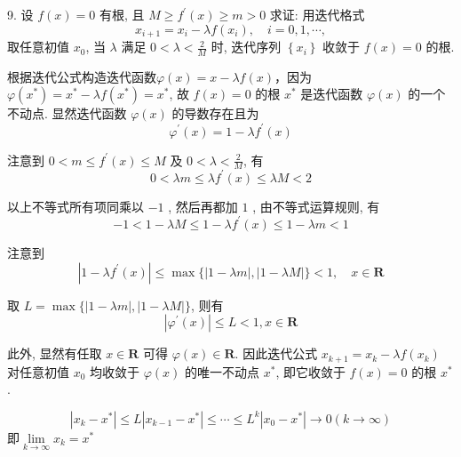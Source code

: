 \begin{tcolorbox}[breakable,enhanced,arc=0mm,outer arc=0mm,
		boxrule=0pt,toprule=1pt,leftrule=0pt,bottomrule=1pt, rightrule=0pt,left=0.2cm,right=0.2cm,
		titlerule=0.5em,toptitle=0.1cm,bottomtitle=-0.1cm,top=0.2cm,
		colframe=white!10!biru,colback=white!90!biru,coltitle=white,
            coltext=black,title =2024-04, title style={white!10!biru}, before skip=8pt, after skip=8pt,before upper=\hspace{2em},
		fonttitle=\bfseries,fontupper=\normalsize]
  
9. 设 $ f(x)=0 $ 有根, 且 $ M \geqslant f^{\prime}(x) \geqslant m>0 $ 求证: 用迭代格式
$$
x_{i+1}=x_{i}-\lambda f\left(x_{i}\right), \quad i=0,1, \cdots,
$$
取任意初值 $ x_{0} $, 当 $ \lambda $ 满足 $ 0<\lambda<\frac{2}{M} $ 时, 迭代序列 $ \left\{x_{i}\right\} $ 收敛于 $ f(x)=0 $ 的根.
\tcblower

根据迭代公式构造迭代函数$\varphi(x)=x-\lambda f(x)$，因为 $ \varphi\left(x^{*}\right)=x^{*}-\lambda f\left(x^{*}\right)=x^{*} $, 故 $ f(x)=0 $ 的根 $ x^{*} $ 是迭代函数 $ \varphi(x) $ 的一个不动点. 显然迭代函数 $ \varphi(x) $ 的导数存在且为
$$
\varphi^{\prime}(x)=1-\lambda f^{\prime}(x)
$$

注意到 $ 0<m \leqslant f^{\prime}(x) \leqslant M $ 及 $ 0<\lambda<\frac{2}{M} $, 有
$$
0<\lambda m \leqslant \lambda f^{\prime}(x) \leqslant \lambda M<2
$$

以上不等式所有项同乘以 $-1$ , 然后再都加 $1$ , 由不等式运算规则, 有
$$
-1<1-\lambda M \leqslant 1-\lambda f^{\prime}(x) \leqslant 1-\lambda m<1
$$

注意到
$$
\left|1-\lambda f^{\prime}(x)\right| \leqslant \max \{|1-\lambda m|,|1-\lambda M|\}<1, \quad x \in \mathbf{R}
$$

取 $ L=\max \{|1-\lambda m|,|1-\lambda M|\} $, 则有
$$
\left|\varphi^{\prime}(x)\right| \leqslant L<1, x \in \mathbf{R}
$$

此外, 显然有任取 $ x \in \mathbf{R} $ 可得 $ \varphi(x) \in \mathbf{R} $. 因此迭代公式 $ x_{k+1}=x_{k}-\lambda f\left(x_{k}\right) $ 对任意初值 $ x_{0} $ 均收敛于 $ \varphi(x) $ 的唯一不动点 $ x^{*} $, 即它收敛于 $ f(x)=0 $ 的根 $ x^{*} $.


\begin{tcolorbox}
    $$
\left|x_{k}-x^{*}\right| \leqslant L\left|x_{k-1}-x^{*}\right| \leqslant \cdots \leqslant L^{k}\left|x_{0}-x^{*}\right| \rightarrow 0(k \rightarrow \infty) 
$$
即$ \lim\limits _{k \rightarrow \infty} x_{k}=x^{*} $
\end{tcolorbox}

\end{tcolorbox}


